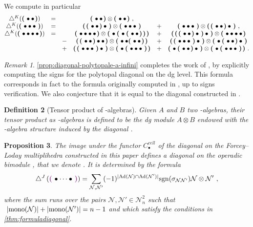 \documentclass[twoside, 11pt]{amsart}
\newtheorem{definition}{Definition}[section]
\newtheorem{proposition}[definition]{Proposition}
\theoremstyle{remark}
\newtheorem{remark}[definition]{\sc Remark}
\begin{document}
We compute in particular 
\[ \begin{matrix}
\diagainf ( \black { \bullet \bullet } )
&=& & \black{\bullet \bullet} \otimes \black{\bullet \bullet} \ , & & \\
\diagainf ( \black { \bullet \bullet \bullet } ) 
&=& & \black{\black{\bullet \bullet} \bullet} \otimes \black{\bullet \bullet \bullet} &+& \black{\bullet \bullet \bullet} \otimes \black{\black{\bullet \bullet} \bullet} \ , \\
\diagainf ( \black{ \bullet \bullet \bullet \bullet} ) 
&=& & 
\black{\bullet \bullet \bullet \bullet} \otimes \black{\bullet \black{ \bullet \black{ \bullet \bullet }} }  
&+& \black{ \black{ \black{\bullet \bullet} \bullet } \bullet }  \otimes \black{ \bullet \bullet \bullet \bullet } \\
& & -& \black{ \black{\bullet \bullet } \bullet \bullet } \otimes \black{ \bullet \bullet \black{ \bullet \bullet }}  &+& \black{ \black{ \bullet \bullet \bullet } \bullet }  \otimes \black{ \bullet \black{ \bullet \bullet } \bullet }  \\ 
& & +& \black{ \black{ \bullet \bullet \bullet } \bullet }  \otimes \black{ \bullet \black{ \bullet \bullet \bullet }} &+& \black{ \bullet \black{ \bullet \bullet } \bullet } \otimes \black{ \bullet \black{ \bullet \bullet \bullet }} \ .
\end{matrix} \]

\begin{remark}
\cref{prop:diagonal-polytopale-a-infini} completes the work of \cite{MTTV19}, by explicitly computing the signs for the polytopal diagonal on the dg level. This formula corresponds in fact to the formula originally computed in \cite{MarklShnider06}, up to signs verification. We also conjecture that it is equal to the diagonal constructed in \cite{SaneblidzeUmble04}.
\end{remark}

\begin{definition}[Tensor product of \Ainf -algebras] \label{def:tensor-product-ainf-alg}
Given $A$ and $B$ two \Ainf -algebras, their tensor product as \Ainf -algebras is defined to be the dg module $A \otimes B$ endowed with the \Ainf -algebra structure induced by the diagonal \diagainf .
\end{definition}

\begin{proposition}
\label{prop:diagonal-polytopale-m-infini}
The image under the functor $C_\bullet^{cell}$ of the diagonal on the Forcey--Loday multiplihedra constructed in this paper defines a diagonal on the operadic bimodule \Minf , that we denote \diagminf . It is determined by the formula
\[ \diagminf \left( \purple{\bullet \cdots \bullet} \right) = 
\sum_{
\mathcal{N},\mathcal{N}'} 
(-1)^{|\mathrm{Ad}(\mathcal{N})\cap \mathrm{Ad}(\mathcal{N}')|}
\mathrm{sgn}(\sigma_{\mathcal{N}\mathcal{N}'})
\mathcal{N} \otimes \mathcal{N}' \ ,\]
where the sum runs over the pairs $\mathcal{N},\mathcal{N}' \in \mathcal{N}^2_n$ such that $\ |\mono(\mathcal{N})|+|\mono(\mathcal{N}')|=n-1$ and which satisfy the conditions in \cref{thm:formuladiagonal}.
\end{proposition}
\end{document}
